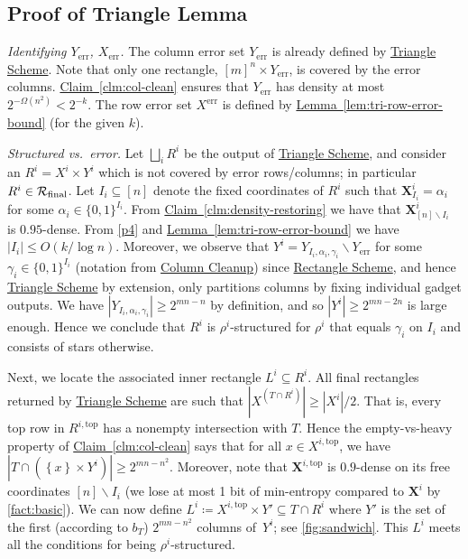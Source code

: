 \documentclass[11pt]{article}
\numberwithin{equation}{section}
\theoremstyle{definition}
\theoremstyle{plain}
\newcommand{\expref}[2]{\hyperref[#2]{#1~\ref{#2}}}
\newcommand{\rectscheme}{\hyperref[alg:partition]{Rectangle Scheme}\xspace}
\newcommand{\trischeme}{\hyperref[alg:tri-partition]{Triangle Scheme}\xspace}
\newcommand{\columnclean}{\hyperref[alg:column-cleanup]{Column Cleanup}\xspace}
\DeclareMathOperator{\err}{err}
\newcommand{\X}{\bm{X}}
\newcommand{\calR}{\mathcal{R}}
\newcommand{\allX}{[m]^n}
\newcommand{\set}[1]{\left \{ #1 \right \}}
\newcommand{\final}{\text{\upshape final}}
\newcommand{\topp}{\text{top}}
\begin{document}
\subsection{Proof of Triangle Lemma} \label{sec:proof-trilemma}

\emph{Identifying $Y_{\err}$, $X_{\err}$.}
The column error set $Y_{\err}$ is already defined by \trischeme. Note that only one rectangle, $\allX\times Y_{\err}$, is covered by the error columns. \expref{Claim}{clm:col-clean} ensures that $Y_{\err}$ has density at most $2^{-\Omega(n^2)} < 2^{-k}$. The row error set $X^{\err}$ is defined by \expref{Lemma}{lem:tri-row-error-bound} (for the given $k$).

\medskip
\noindent \emph{Structured vs.\ error.}
Let $\bigsqcup_i R^i$ be the output of \trischeme, and consider an $R^i=X^i\times Y^i$ which is not covered by error rows/columns; in particular $R^i\in\calR_{\final}$. Let $I_i\subseteq[n]$ denote the fixed coordinates of $R^i$ such that $\X^i_{I_i}=\alpha_i$ for some $\alpha_i\in\{0,1\}^{I_i}$. {}From \expref{Claim}{clm:density-restoring} we have that $\X^i_{[n] \smallsetminus I_i}$ is $0.95$-dense. {}From \ref{p4} and \expref{Lemma}{lem:tri-row-error-bound} we have $|I_i|\leq O(k/\log n)$. Moreover, we observe that $Y^i = Y_{I_i,\alpha_i,\gamma_i}\smallsetminus Y_{\err}$ for some $\gamma_i\in\{0,1\}^{I_i}$ (notation from \columnclean) since \rectscheme, and hence \trischeme by extension, only partitions columns by fixing individual gadget outputs. We have $|Y_{I_i,\alpha_i,\gamma_i}|\geq 2^{mn-n}$ by definition, and so $|Y^i|\geq 2^{mn-2n}$ is large enough. %
Hence we conclude that $R^i$ is $\rho^i$-structured for $\rho^i$ that equals $\gamma_i$ on $I_i$ and consists of stars otherwise.

Next, we locate the associated inner rectangle $L^i\subseteq R^i$. All final rectangles
returned %
by \trischeme are such that $|X^{(T \cap R^i)}| \ge |X^i|/2$. That is, every top row in $R^{i,\topp}$ has a nonempty intersection with $T$. Hence the empty-vs-heavy property of \expref{Claim}{clm:col-clean} says that for all $x\in X^{i,\topp}$, we have $|T \cap (\set{x} \times Y^i)| \ge 2^{mn-n^2}$. Moreover, note that $\X^{i,\topp}$ is $0.9$-dense on its free coordinates $[n] \smallsetminus I_i$ (we lose at most 1 bit of min-entropy compared to $\X^i$ by \autoref{fact:basic}). We can now define $L^i\coloneqq X^{i,\topp}\times Y'\subseteq T\cap R^i$ where $Y'$ is the set of the first (according to $b_T$) $2^{mn-n^2}$ columns of~$Y^i$; see \autoref{fig:sandwich}. This $L^i$ meets all the conditions for being $\rho^i$-structured.
\end{document}
